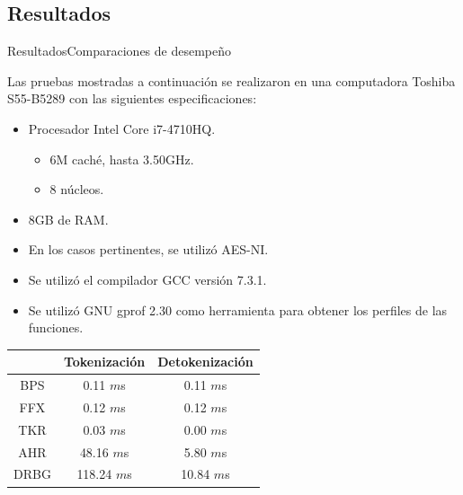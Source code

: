 %
%
%

\subsection{Resultados}

\begin{frame}{Resultados}{Comparaciones de desempeño}
  {
    Las pruebas mostradas a continuación se realizaron en una computadora
    Toshiba S55-B5289 con las siguientes especificaciones:
    \begin{itemize}
      \item Procesador Intel Core i7-4710HQ.
      \begin{itemize}
        \item 6M caché, hasta 3.50GHz.
        \item 8 núcleos.
      \end{itemize}
      \item 8GB de RAM.
      \item En los casos pertinentes, se utilizó AES-NI\footnotemark.
      \item Se utilizó el compilador GCC versión 7.3.1.
      \item Se utilizó GNU gprof 2.30 como herramienta para obtener los
        perfiles de las funciones.
    \end{itemize}
  }
  {
    {\small
      \begin{table}
        \begin{center}
          \begin{tabular}{c|c|c|}
            \cline{2-3}
            & Tokenización & Detokenización \\
            \hline
            \multicolumn{1}{|c|}{BPS}
              & 0.11   $m$s & 0.11 $m$s   \\\hline
            \multicolumn{1}{|c|}{FFX}
              & 0.12   $m$s & 0.12 $m$s   \\\hline

            \multicolumn{1}{|c|}{TKR}
              & 0.03   $m$s & 0.00 $m$s\footnotemark   \\\hline
            \multicolumn{1}{|c|}{AHR}
              & 48.16  $m$s & 5.80 $m$s   \\\hline
            \multicolumn{1}{|c|}{DRBG}
              & 118.24 $m$s & 10.84 $m$s  \\\hline
          \end{tabular}


\end{center}
\end{table}}}
\end{frame}
